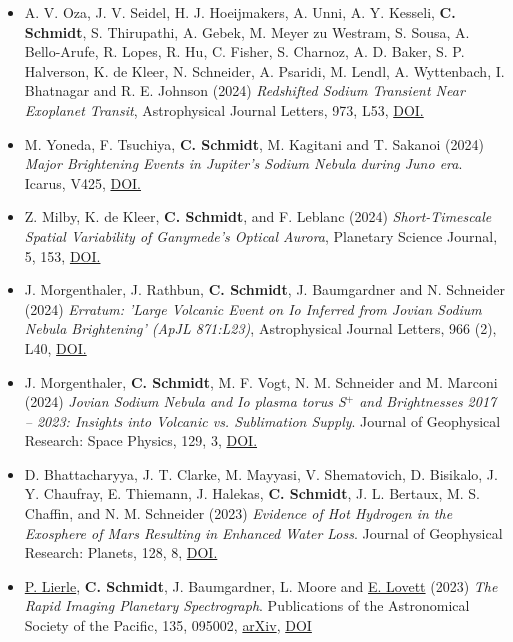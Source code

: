 \documentclass[12pt]{report}
\begin{document}
\begin{itemize} \itemsep -2pt %
  \item A. V. Oza, J. V. Seidel, H. J. Hoeijmakers, A. Unni, A. Y. Kesseli, \textbf{C. Schmidt}, S. Thirupathi, A. Gebek, M. Meyer zu Westram, S. Sousa, A. Bello-Arufe, R. Lopes, R. Hu, C. Fisher, S. Charnoz, A. D. Baker, S. P. Halverson, K. de Kleer, N. Schneider, A. Psaridi, M. Lendl, A. Wyttenbach, I. Bhatnagar and R. E. Johnson (2024) \textit{Redshifted Sodium Transient Near Exoplanet Transit}, Astrophysical Journal Letters, 973, L53, \href{https://doi.org/10.3847/2041-8213/ad6b29}{DOI.} 
  \item M. Yoneda, F. Tsuchiya, \textbf{C. Schmidt}, M. Kagitani and T. Sakanoi (2024) \textit{Major Brightening Events in Jupiter's Sodium Nebula during Juno era}. Icarus, V425, \href{https://doi.org/10.1016/j.icarus.2024.116301}{DOI.} 
  \item Z. Milby, K. de Kleer, \textbf{C. Schmidt}, and F. Leblanc (2024) \textit{Short-Timescale Spatial Variability of Ganymede’s Optical Aurora}, Planetary Science Journal, 5, 153, \href{https://doi.org/10.3847/PSJ/ad49a2}{DOI.} 
  \item J. Morgenthaler, J. Rathbun, \textbf{C. Schmidt}, J. Baumgardner and N. Schneider (2024) \textit{Erratum: 'Large Volcanic Event on Io Inferred from Jovian Sodium Nebula Brightening' (ApJL 871:L23)}, Astrophysical Journal Letters, 966 (2), L40, \href{https://doi.org/10.3847/2041-8213/ad4497}{DOI.}
  \item J. Morgenthaler, \textbf{C. Schmidt}, M. F. Vogt, N. M. Schneider and M. Marconi (2024) \textit{Jovian Sodium Nebula and Io plasma torus S$^+$ and Brightnesses 2017 – 2023: Insights into Volcanic vs. Sublimation Supply}. Journal of Geophysical Research: Space Physics, 129, 3, \href{https://doi.org/10.1029/2023JA032081}{DOI.}
  \item D. Bhattacharyya, J. T. Clarke, M. Mayyasi, V. Shematovich, D. Bisikalo, J. Y. Chaufray, E. Thiemann, J. Halekas, \textbf{C. Schmidt}, J. L. Bertaux, M. S. Chaffin, and N. M. Schneider (2023) \textit{Evidence of Hot Hydrogen in the Exosphere of Mars Resulting in Enhanced Water Loss}. Journal of Geophysical Research: Planets, 128, 8, \href{https://doi.org/10.1029/2023JE007801}{DOI.} 
  \item \underline{P. Lierle}, \textbf{C. Schmidt}, J. Baumgardner, L. Moore and \underline{E. Lovett} (2023) \textit{The Rapid Imaging Planetary Spectrograph}. Publications of the Astronomical Society of the Pacific, 135, 095002, \href{https://arxiv.org/abs/2307.16872}{arXiv}, \href{https://doi.org/10.1088/1538-3873/acec9f}{DOI}

\end{itemize}
\end{document}
